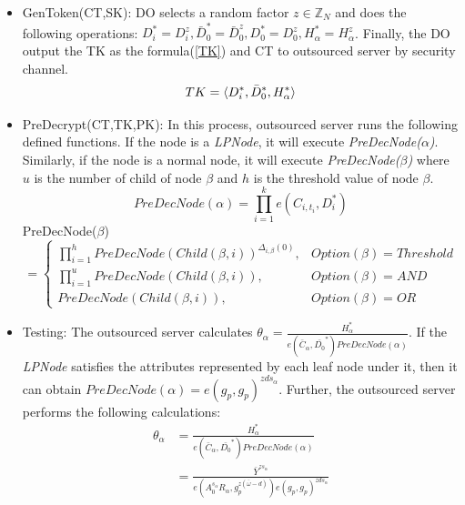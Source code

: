 \documentclass[smallextended]{svjour3}       %
\begin{document}
\begin{itemize}
	



	\item GenToken(CT,SK): DO selects a random factor $z \in \mathbb{Z}_N$ and does the following operations: $D_i^*=D_i^z,\bar{D}_0^*=\bar{D}_0^z,D_0^*=D_0^z,H_\alpha^*=H_\alpha^z$. 
	Finally, the DO output the TK as the formula(\ref{TK}) and CT to outsourced server by security channel.
	\begin{equation}\label{TK}\\
		TK=\langle D_i^*,\bar{D}_0^*,H^*_\alpha  \rangle
	\end{equation}
	\item PreDecrypt(CT,TK,PK): 
	In this process, outsourced server runs the following defined functions. 
	If the node is a \textit{LPNode}, it will execute \textit{PreDecNode($\alpha$)}. 
	Similarly, if the node is a normal node, it will execute \textit{PreDecNode($\beta$)} where $u$ is the number of child of node $\beta$ and $h$ is the threshold value of node $\beta$.
	\begin{equation}\label{PreDecNodeA}
		PreDecNode(\alpha)=\prod_{i=1}^{k}e(C_{i,t_i},D_i^*)
	\end{equation}
	PreDecNode($\beta$)
	\begin{equation}\label{PreDecNodeB}
		=
		\begin{cases}
		\prod_{i=1}^{h}PreDecNode(Child(\beta,i))^{\Delta_{i,\beta}(0)}, &Option(\beta)=Threshold\\
		\prod_{i=1}^{u}PreDecNode(Child(\beta,i)), &Option(\beta)=AND\\
		PreDecNode(Child(\beta,i)), &Option(\beta)=OR
		\end{cases}
	\end{equation}
	\item Testing: The outsourced server calculates $\theta_\alpha=\frac{H_\alpha^*}{e(\bar{C}_\alpha,\bar{D_0}^*)PreDecNode(\alpha)}$. 
	If the \textit{LPNode} satisfies the attributes represented by each leaf node under it, then it can obtain $PreDecNode(\alpha)=e(g_p,g_p)^{zds_\alpha}$. Further, the outsourced server performs the following calculations:
	\begin{equation}
		\begin{split}
			\theta_\alpha &=\frac{H_\alpha^*}{e(\bar{C}_\alpha,\bar{D_0}^*)PreDecNode(\alpha)}\\
						  &=\frac{\bar{Y}^{zs_\alpha}}{e(A_0^{s_\alpha}R_\alpha,g_p^{z(\bar{\omega}-d)})e(g_p,g_p)^{zds_\alpha}}\\

\end{split}
\end{equation}
\end{itemize}
\end{document}
